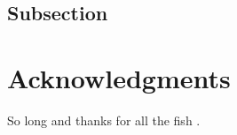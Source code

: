 \documentclass[fleqn,10pt]{SelfArx} %
\begin{document}
	\lipsum[14] %
	
	\subsection{Subsection}
	
	\lipsum[15-23] %
	
	\section*{Acknowledgments} %
	
	
	So long and thanks for all the fish \cite{Figueredo:2009dg}.
	
	
	
	
	
\end{document}
